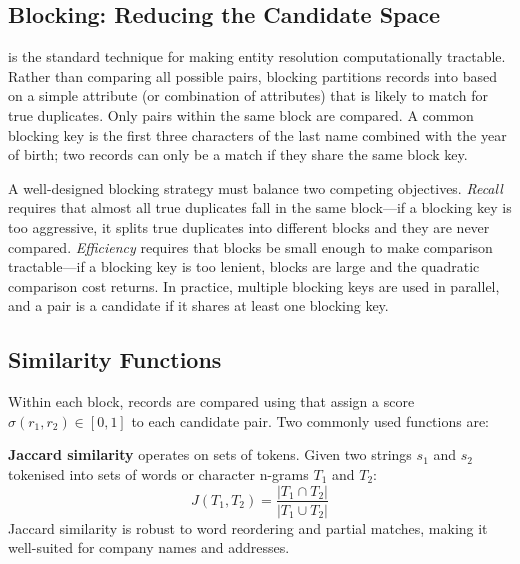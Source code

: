 \subsection{Blocking: Reducing the Candidate Space}
\label{subsec:blocking}

 is the standard technique for making entity resolution
computationally tractable. Rather than comparing all possible pairs,
blocking partitions records into  based on a simple
attribute (or combination of attributes) that is likely to match for
true duplicates. Only pairs within the same block are compared. A common
blocking key is the first three characters of the last name combined
with the year of birth; two records can only be a match if they share
the same block key.

A well-designed blocking strategy must balance two competing
objectives. \emph{Recall} requires that almost all true duplicates fall
in the same block---if a blocking key is too aggressive, it splits true
duplicates into different blocks and they are never compared.
\emph{Efficiency} requires that blocks be small enough to make
comparison tractable---if a blocking key is too lenient, blocks are
large and the quadratic comparison cost returns. In practice, multiple
blocking keys are used in parallel, and a pair is a candidate if it
shares at least one blocking key.

\subsection{Similarity Functions}
\label{subsec:similarity}

Within each block, records are compared using  that assign a score $\sigma(r_1, r_2) \in [0, 1]$ to each
candidate pair. Two commonly used functions are:

\textbf{Jaccard similarity} operates on sets of tokens. Given two
strings $s_1$ and $s_2$ tokenised into sets of words or character
n-grams $T_1$ and $T_2$:
\begin{equation}
J(T_1, T_2) = \frac{|T_1 \cap T_2|}{|T_1 \cup T_2|}
\label{eq:jaccard}
\end{equation}
Jaccard similarity is robust to word reordering and partial matches,
making it well-suited for company names and addresses.

